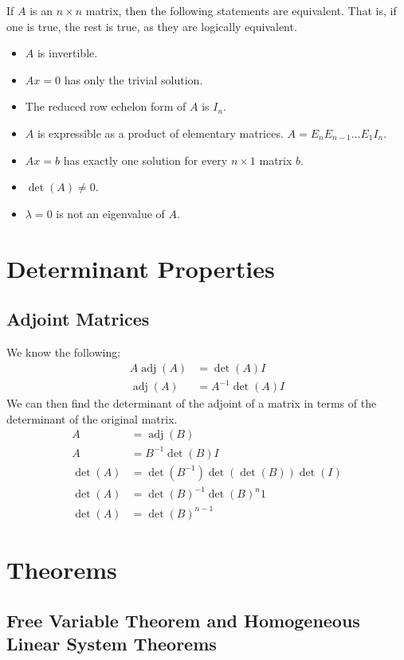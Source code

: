 \documentclass[12pt]{article}
\DeclareMathOperator{\adj}{adj}
\begin{document}
If $A$ is an $n \times n$ matrix, then the following statements are equivalent. That is, if one is true, the rest is true, as they are logically equivalent.
\begin{itemize}
    \item $A$ is invertible.
    \item $Ax = 0$ has only the trivial solution.
    \item The reduced row echelon form of $A$ is $I_n$.
    \item $A$ is expressible as a product of elementary matrices. $A = E_nE_{n-1}\dots E_1I_n$.
    \item $Ax = b$ has exactly one solution for every $n \times 1$ matrix $b$.
    \item $\det(A) \neq 0$.
    \item $\lambda = 0$ is not an eigenvalue of $A$.
\end{itemize}


\section{Determinant Properties}


\subsection{Adjoint Matrices}

We know the following:
\begin{align*}
    A\adj(A) &= \det(A)I\\
    \adj(A) &= A^{-1}\det(A)I
\end{align*}
We can then find the determinant of the adjoint of a matrix in terms of the determinant of the original matrix.
\begin{align*}
    A &= \adj(B)\\
    A &= B^{-1}\det(B)I\\
    \det(A) &= \det(B^{-1}) \det(\det(B)) \det(I)\\
    \det(A) &= \det(B)^{-1} \det(B)^n 1\\
    \det(A) &= \det(B)^{n-1}
\end{align*}


\section{Theorems}


\subsection{Free Variable Theorem and Homogeneous Linear System Theorems}
\end{document}
